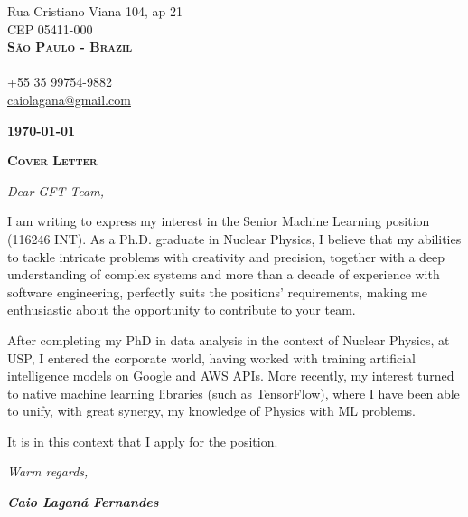 \documentclass[twoside]{letter}
\begin{document}
\justifying

\parbox{\linewidth}
{
\begin{flushright}
Rua Cristiano Viana 104, ap 21\\
CEP 05411-000\\
\textbf{\textsc{São Paulo - Brazil}}\\
\mbox{}\\
+55 35 99754-9882\\
\href{mailto:caiolagana@gmail.com}{caiolagana@gmail.com}
\end{flushright}
}

\textbf{\today}


\vspace{2em}

\begin{center}\textsc{\Large \textbf{Cover Letter}}\end{center}

\emph{Dear GFT Team,}


I am writing to express my interest in the Senior Machine Learning position (116246 INT). As a Ph.D. graduate in Nuclear Physics, I believe that my abilities to tackle intricate problems with creativity and precision, together with a deep understanding of complex systems and more than a decade of experience with software engineering, perfectly suits the positions' requirements, making me enthusiastic about the opportunity to contribute to your team.

After completing my PhD in data analysis in the context of Nuclear Physics, at USP, I entered the corporate world, having worked with training artificial intelligence models on Google and AWS APIs. More recently, my interest turned to native machine learning libraries (such as TensorFlow), where I have been able to unify, with great synergy, my knowledge of Physics with ML problems.

It is in this context that I apply for the position.

\bigskip

\emph{Warm regards,}

\vfill

    \parbox{\linewidth}
    {
    \begin{flushright}
        \textbf{\emph{Caio Laganá Fernandes}}
    \end{flushright}
    }
\end{document}
